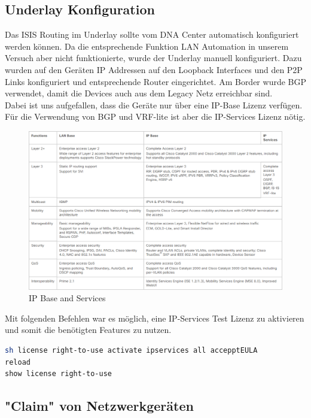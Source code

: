 \subsection{Underlay Konfiguration}

Das ISIS Routing im Underlay sollte vom DNA Center automatisch konfiguriert werden können. Da die entsprechende Funktion LAN Automation in unserem Versuch aber nicht funktionierte, wurde der Underlay manuell konfiguriert. Dazu wurden auf den Geräten IP Addressen auf den Loopback Interfaces und den P2P Links konfiguriert und entsprechende Router eingerichtet. Am Border wurde BGP verwendet, damit die Devices auch aus dem Legacy Netz erreichbar sind.\\
Dabei ist uns aufgefallen, dass die Geräte nur über eine IP-Base Lizenz verfügen. Für die Verwendung von BGP und VRF-lite ist aber die IP-Services Lizenz nötig. 

\begin{figure}[H]
	\centering
	\includegraphics[width=16cm]{img/IPBaseServices.png}
	\caption{IP Base and Services}
	\label{fig:IP Base and Services Licences}
\end{figure}

Mit folgenden Befehlen war es möglich, eine IP-Services Test Lizenz zu aktivieren und somit die benötigten Features zu nutzen.

\begin{lstlisting}[language=bash]
sh license right-to-use activate ipservices all accepptEULA
reload
show license right-to-use
\end{lstlisting}

\subsection{"Claim" von Netzwerkgeräten}

